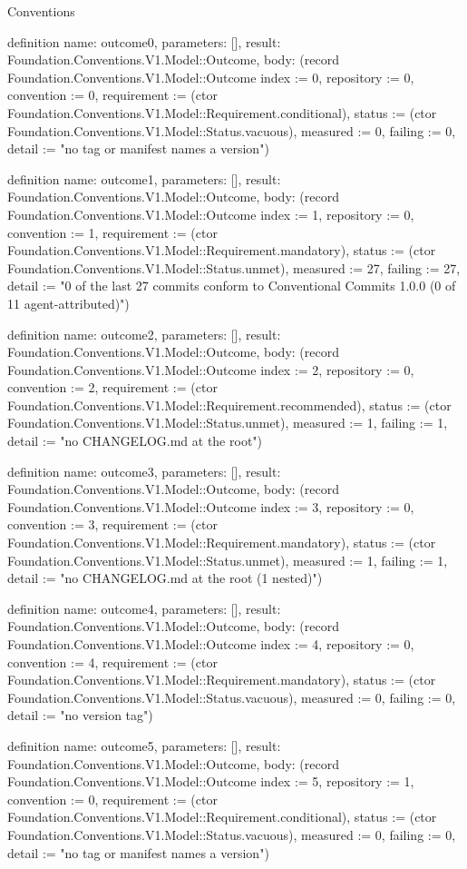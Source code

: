 \begin{lexlean}{Conventions}
\begin{semanticmodule}
definition{
  name: outcome0,
  parameters: [],
  result: Foundation.Conventions.V1.Model::Outcome,
  body: (record Foundation.Conventions.V1.Model::Outcome {index := 0, repository := 0, convention := 0, requirement := (ctor Foundation.Conventions.V1.Model::Requirement.conditional), status := (ctor Foundation.Conventions.V1.Model::Status.vacuous), measured := 0, failing := 0, detail := "no tag or manifest names a version"})
}

definition{
  name: outcome1,
  parameters: [],
  result: Foundation.Conventions.V1.Model::Outcome,
  body: (record Foundation.Conventions.V1.Model::Outcome {index := 1, repository := 0, convention := 1, requirement := (ctor Foundation.Conventions.V1.Model::Requirement.mandatory), status := (ctor Foundation.Conventions.V1.Model::Status.unmet), measured := 27, failing := 27, detail := "0 of the last 27 commits conform to Conventional Commits 1.0.0 (0 of 11 agent-attributed)"})
}

definition{
  name: outcome2,
  parameters: [],
  result: Foundation.Conventions.V1.Model::Outcome,
  body: (record Foundation.Conventions.V1.Model::Outcome {index := 2, repository := 0, convention := 2, requirement := (ctor Foundation.Conventions.V1.Model::Requirement.recommended), status := (ctor Foundation.Conventions.V1.Model::Status.unmet), measured := 1, failing := 1, detail := "no CHANGELOG.md at the root"})
}

definition{
  name: outcome3,
  parameters: [],
  result: Foundation.Conventions.V1.Model::Outcome,
  body: (record Foundation.Conventions.V1.Model::Outcome {index := 3, repository := 0, convention := 3, requirement := (ctor Foundation.Conventions.V1.Model::Requirement.mandatory), status := (ctor Foundation.Conventions.V1.Model::Status.unmet), measured := 1, failing := 1, detail := "no CHANGELOG.md at the root (1 nested)"})
}

definition{
  name: outcome4,
  parameters: [],
  result: Foundation.Conventions.V1.Model::Outcome,
  body: (record Foundation.Conventions.V1.Model::Outcome {index := 4, repository := 0, convention := 4, requirement := (ctor Foundation.Conventions.V1.Model::Requirement.mandatory), status := (ctor Foundation.Conventions.V1.Model::Status.vacuous), measured := 0, failing := 0, detail := "no version tag"})
}

definition{
  name: outcome5,
  parameters: [],
  result: Foundation.Conventions.V1.Model::Outcome,
  body: (record Foundation.Conventions.V1.Model::Outcome {index := 5, repository := 1, convention := 0, requirement := (ctor Foundation.Conventions.V1.Model::Requirement.conditional), status := (ctor Foundation.Conventions.V1.Model::Status.vacuous), measured := 0, failing := 0, detail := "no tag or manifest names a version"})
}


\end{semanticmodule}
\end{lexlean}
